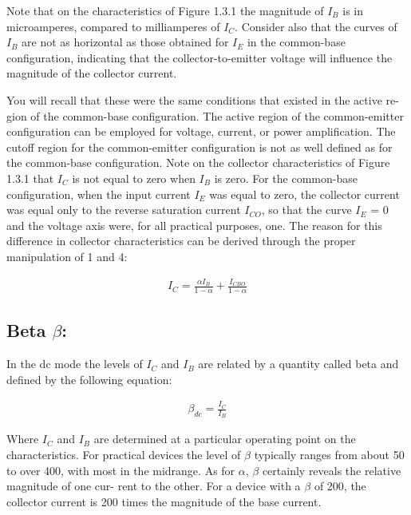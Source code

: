 \pagebreak

Note that on the characteristics of Figure 1.3.1 the magnitude of $I_{B}$ is in microamperes, compared to milliamperes of $I_{C}$. Consider also that the curves of $I_{B}$ are not as horizontal as those obtained for $I_{E}$ in the common-base configuration, indicating that the collector-to-emitter voltage will influence the magnitude of the collector current. \hfill \break 

{\large\bfseries\itshape\color{carmine}{In the active region of a common-emitter amplifier the collector-base junction is reverse-biased, while the base-emitter junction is forward-biased.}} \hfill \break

You will recall that these were the same conditions that existed in the active re- gion of the common-base configuration. The active region of the common-emitter configuration can be employed for voltage, current, or power amplification. The cutoff region for the common-emitter configuration is not as well defined as for the common-base configuration. Note on the collector characteristics of Figure 1.3.1 that $I_{C}$ is not equal to zero when $I_{B}$ is zero. For the common-base configuration, when the input current $I_{E}$ was equal to zero, the collector current was equal only to the reverse saturation current $I_{CO}$, so that the curve $I_{E}$ = 0 and the voltage axis were, for all practical purposes, one. The reason for this difference in collector characteristics can be derived through the proper manipulation of 1 and 4:

\begin{ceqn}
\begin{align}
I_{C} = \frac{\alpha I_{B}}{1 - \alpha} + \frac{I_{CBO}}{1 - \alpha}
\end{align}
\end{ceqn}

\subsection{Beta $\beta$:}

In the dc mode the levels of $I_{C}$ and $I_{B}$ are related by a quantity called beta and defined by the following equation:

\begin{ceqn}
\begin{align}
\beta_{dc} = \frac{I_{C}}{I_{B}}
\end{align}
\end{ceqn}

Where $I_{C}$ and $I_{B}$ are determined at a particular operating point on the characteristics. For practical devices the level of $\beta$ typically ranges from about 50 to over 400, with most in the midrange. As for $\alpha$, $\beta$ certainly reveals the relative magnitude of one cur- rent to the other. For a device with a $\beta$ of 200, the collector current is 200 times the magnitude of the base current. \hfill \break

